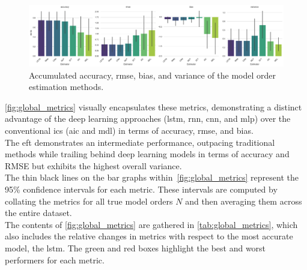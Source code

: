 \begin{figure}[H]
    \centering
    \includegraphics[width=1\textwidth]{figures/07_Evaluation/global_metrics_acc,bias,var.png}
    \caption{Accumulated accuracy, \gls{rmse}, bias, and variance of the model order estimation methods.}
    \label{fig:global_metrics}
\end{figure}
\autoref{fig:global_metrics} visually encapsulates these metrics, demonstrating a distinct advantage of the deep
learning approaches (\gls{lstm}, \gls{rnn}, \gls{cnn}, and \gls{mlp}) over the conventional
\glspl{ic} (\gls{aic} and \gls{mdl}) in terms of accuracy, \gls{rmse}, and bias.\\
The \gls{eft} demonstrates an intermediate performance, outpacing traditional methods while trailing
behind deep learning models in terms of accuracy and RMSE but exhibits the highest overall
variance. \\
The thin black lines on the bar graphs within~\autoref{fig:global_metrics} represent the 95\% confidence intervals
for each metric. These intervals are computed by collating the metrics for all true model orders \(N\) and then averaging
them across the entire dataset. \\

The contents of \autoref{fig:global_metrics} are gathered in \autoref{tab:global_metrics}, which also includes the
relative changes in metrics with respect to the most accurate model, the \gls{lstm}.
The green and red boxes highlight the best and worst performers for each metric. \\

